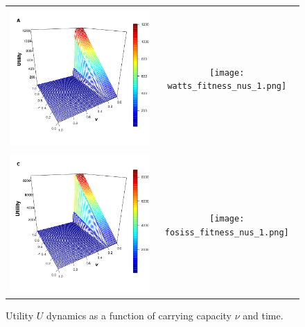 \documentclass[11pt]{article}
\begin{document}
\begin{figure} [h!]
\centering
\begin{tabular}{cc}

\includegraphics[scale=0.28]{images/erdos_fitness_nus_1.png} & \texttt{[image: watts\_fitness\_nus\_1.png]} \\
\includegraphics[scale=0.28]{images/barabasi_fitness_nus_1.png} & \texttt{[image: fosiss\_fitness\_nus\_1.png]}
\end{tabular}
\caption{Utility $U$ dynamics as a function of carrying capacity $\nu$ and time.}\label{fitness}
\end{figure}
\end{document}
